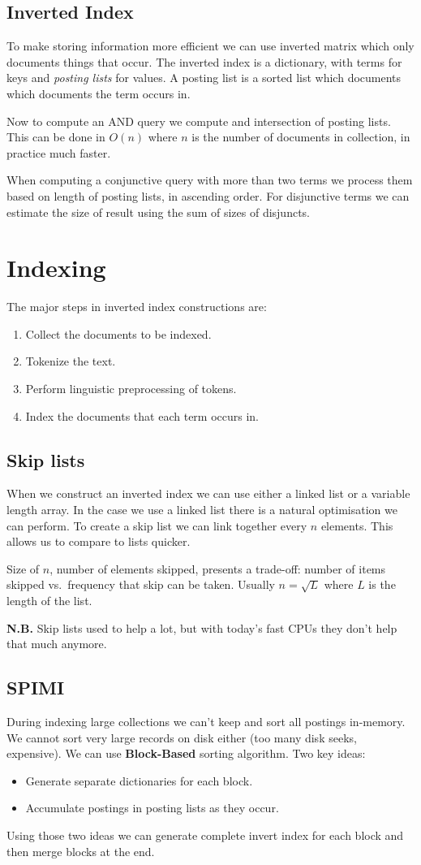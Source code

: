 \documentclass[a5paper]{report}
\newcommand\nb{\par\nobreak\smallskip\textbf{N.B. }}
\begin{document}
\section{Inverted Index}
To make storing information more efficient we can use inverted matrix which only documents things that occur.
The inverted index is a dictionary, with terms for keys and \emph{posting lists} for values.
A posting list is a sorted list which documents which documents the term occurs in.

Now to compute an AND query we compute and intersection of posting lists.
This can be done in $O(n)$ where $n$ is the number of documents in collection, in practice much faster.

When computing a conjunctive query with more than two terms we process them based on length of posting lists, in ascending order.
For disjunctive terms we can estimate the size of result using the sum of sizes of disjuncts.

\chapter{Indexing}
The major steps in inverted index constructions are:
\begin{enumerate}
\item Collect the documents to be indexed.
\item Tokenize the text.
\item Perform linguistic preprocessing of tokens.
\item Index the documents that each term occurs in.
\end{enumerate}
\section{Skip lists}
When we construct an inverted index we can use either a linked list or a variable length array.
In the case we use a linked list there is a natural optimisation we can perform.
To create a skip list we can link together every $n$ elements.
This allows us to compare to lists quicker.

Size of $n$, number of elements skipped, presents a trade-off: number of items skipped vs.\ frequency that skip can be taken.
Usually $n=\sqrt{L}$ where $L$ is the length of the list.
\nb Skip lists used to help a lot, but with today's fast CPUs they don't help that much anymore.
\section{SPIMI}
During indexing large collections we can't keep and sort all postings in-memory.
We cannot sort very large records on disk either (too many disk seeks, expensive).
We can use \textbf{Block-Based} sorting algorithm.
Two key ideas:
\begin{itemize}
\item Generate separate dictionaries for each block.
\item Accumulate postings in posting lists as they occur.
\end{itemize}
Using those two ideas we can generate complete invert index for each block and then merge blocks at the end.
\end{document}
